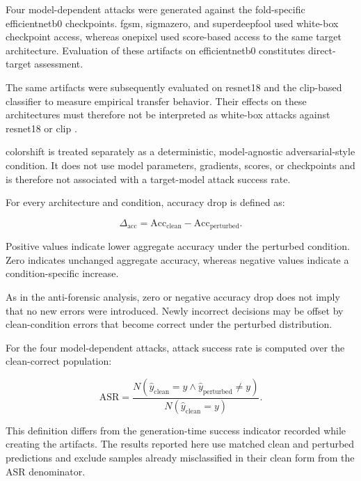 Four model-dependent attacks were generated against the fold-specific
\gls{efficientnetb0} checkpoints. \gls{fgsm}, \gls{sigmazero}, and
\gls{superdeepfool} used white-box checkpoint access, whereas
\gls{onepixel} used score-based access to the same target architecture.
Evaluation of these artifacts on \gls{efficientnetb0} constitutes direct-target
assessment.

The same artifacts were subsequently evaluated on \gls{resnet18} and the
\gls{clip}-based classifier to measure empirical transfer behavior. Their effects on
these architectures must therefore not be interpreted as white-box attacks
against \gls{resnet18} or \gls{clip}
\cite{biggio2018wild,nowroozi2021survey,barni2018cf}.

\gls{colorshift} is treated separately as a deterministic, model-agnostic
adversarial-style condition. It does not use model parameters, gradients,
scores, or checkpoints and is therefore not associated with a target-model
attack success rate.

For every architecture and condition, accuracy drop is defined as:

\begin{equation}
\Delta_{\mathrm{acc}}
=
\mathrm{Acc}_{\mathrm{clean}}
-
\mathrm{Acc}_{\mathrm{perturbed}}.
\end{equation}

Positive values indicate lower aggregate accuracy under the perturbed
condition. Zero indicates unchanged aggregate accuracy, whereas negative
values indicate a condition-specific increase.

As in the anti-forensic analysis, zero or negative accuracy drop does not imply
that no new errors were introduced. Newly incorrect decisions may be offset by
clean-condition errors that become correct under the perturbed distribution.

For the four model-dependent attacks, attack success rate is computed over the
clean-correct population:

\begin{equation}
\mathrm{ASR}
=
\frac{
N\!\left(
\widehat{y}_{\mathrm{clean}}=y
\land
\widehat{y}_{\mathrm{perturbed}}\neq y
\right)
}{
N\!\left(
\widehat{y}_{\mathrm{clean}}=y
\right)
}.
\end{equation}

This definition differs from the generation-time success indicator recorded
while creating the artifacts. The results reported here use matched clean and
perturbed predictions and exclude samples already misclassified in their clean
form from the ASR denominator.

